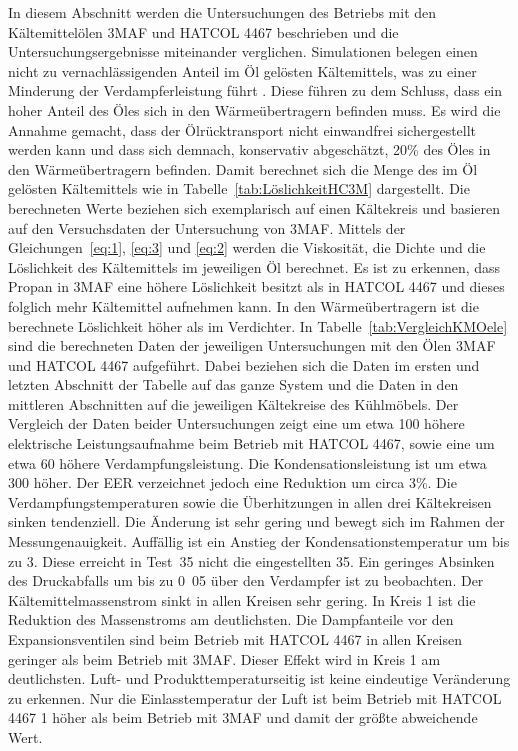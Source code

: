In diesem Abschnitt werden die Untersuchungen des Betriebs mit den Kältemittelölen 3MAF und HATCOL 4467 beschrieben und die Untersuchungsergebnisse miteinander verglichen.
Simulationen belegen einen nicht zu vernachlässigenden Anteil im Öl gelösten Kältemittels, was zu einer Minderung der Verdampferleistung führt \cite{Universitatpolitecnicadevalencia.2017}. Diese führen zu dem Schluss, dass ein hoher Anteil des Öles sich in den Wärmeübertragern befinden muss. Es wird die Annahme gemacht, dass der Ölrücktransport nicht einwandfrei sichergestellt werden kann und dass sich demnach, konservativ abgeschätzt, \unit{20}{\%} des Öles in den Wärmeübertragern befinden. Damit berechnet sich die Menge des im Öl gelösten Kältemittels wie in Tabelle~\ref{tab:LöslichkeitHC3M} dargestellt.
Die berechneten Werte beziehen sich exemplarisch auf einen Kältekreis und basieren auf den Versuchsdaten der Untersuchung von 3MAF.
Mittels der Gleichungen~\ref{eq:1}, \ref{eq:3} und \ref{eq:2} werden die Viskosität, die Dichte und die Löslichkeit des Kältemittels im jeweiligen Öl berechnet. Es ist zu erkennen, dass Propan in 3MAF eine höhere Löslichkeit besitzt als in HATCOL 4467 und dieses folglich mehr Kältemittel aufnehmen kann. In den Wärmeübertragern ist die berechnete Löslichkeit höher als im Verdichter. \newline
In Tabelle~\ref{tab:VergleichKMOele} sind die berechneten Daten der jeweiligen Untersuchungen mit den Ölen 3MAF und HATCOL 4467 aufgeführt. Dabei beziehen sich die Daten im ersten und letzten Abschnitt der Tabelle auf das ganze System und die Daten in den mittleren Abschnitten auf die jeweiligen Kältekreise des Kühlmöbels.
Der Vergleich der Daten beider Untersuchungen zeigt eine um etwa \unit{100}{\watt} höhere elektrische Leistungsaufnahme beim Betrieb mit HATCOL 4467, sowie eine um etwa \unit{60}{\watt} höhere Verdampfungsleistung. Die Kondensationsleistung ist um etwa \unit{300}{\watt} höher. Der EER verzeichnet jedoch eine Reduktion um circa \unit{3}{\%}. Die Verdampfungstemperaturen sowie die Überhitzungen in allen drei Kältekreisen sinken tendenziell. Die Änderung ist sehr gering und bewegt sich im Rahmen der Messungenauigkeit. \newline
Auffällig ist ein Anstieg der Kondensationstemperatur um bis zu \unit{3}{\kelvin}. Diese erreicht in Test~35 nicht die eingestellten \unit{35}{\celsius}. Ein geringes Absinken des Druckabfalls um bis zu \unit{0.05}{\bbar} über den Verdampfer ist zu beobachten. Der Kältemittelmassenstrom sinkt in allen Kreisen sehr gering. In Kreis 1 ist die Reduktion des Massenstroms am deutlichsten. Die Dampfanteile vor den Expansionsventilen sind beim Betrieb mit HATCOL 4467 in allen Kreisen geringer als beim Betrieb mit 3MAF. Dieser Effekt wird in Kreis 1 am deutlichsten. 
Luft- und Produkttemperaturseitig ist keine eindeutige Veränderung zu erkennen. 
Nur die Einlasstemperatur der Luft ist beim Betrieb mit HATCOL 4467 \unit{1}{\kelvin} höher als beim Betrieb mit 3MAF und damit der größte abweichende Wert. 

